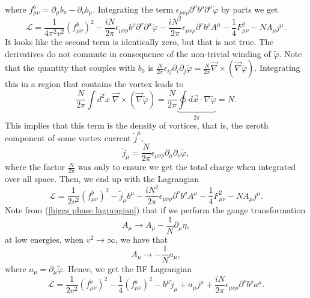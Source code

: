 \documentclass{article}
\begin{document}
where $f_{\mu\nu}^b = \partial_\mu b_\nu - \partial_\nu b_\mu$. Integrating the term $\epsilon_{\mu\nu\rho}\partial^\nu b^\rho\partial^\mu\tilde{\varphi}$ by parts we get 
\begin{equation}
	\mathcal{L} = \frac{1}{4\pi^2v^2}(f_{\mu\nu}^b)^2-\frac{iN}{2\pi}\epsilon_{\mu\nu\rho}b^\rho\partial^\nu\partial^\mu\tilde{\varphi} - \frac{iN^2}{2\pi}\epsilon_{\mu\nu\rho}\partial^\nu b^\rho A^\mu -\frac{1}{4}F_{\mu\nu}^2-NA_\mu j^{\mu}. 
\end{equation}
It looks like the second term is identically zero, but that is not true. The derivatives do not commute in consequence of the non-trivial winding of $\tilde{\varphi}$. Note that the quantity that couples with $b_0$ is $\frac{N}{2\pi}\epsilon_{ij}\partial_i\partial_j\tilde{\varphi}=\frac{N}{2\pi}\vec{\nabla}\times(\vec{\nabla}\tilde{\varphi})$. Integrating this in a region that contains the vortex leads to 
\begin{equation}
	\frac{N}{2\pi}	\int d^2x\;\vec{\nabla}\times(\vec{\nabla}\tilde{\varphi}) = \frac{N}{2\pi}\underbrace{\oint d\vec{x}\cdot \nabla\tilde{\varphi}}_{2\pi} = N. 
\end{equation}
This implies that this term is the density of vortices, that is, the zeroth component of some vortex current $\tilde{j}^\mu$, 
\begin{equation}
	\tilde{j}_\mu = \frac{N}{2\pi}\epsilon_{\mu\nu\rho}\partial_{\mu}\partial_{\nu}\tilde{\varphi},
\end{equation} 
where the factor $\frac{N}{2\pi}$ was only to ensure we get the total charge when integrated over all space. Then, we end up with the Lagrangian 
\begin{equation}
	\mathcal{L} = \frac{1}{2v^2}(f_{\mu\nu}^b)^2-\tilde{j}_\mu b^\mu -\frac{iN^2}{2\pi}\epsilon_{\mu\nu\rho}\partial^\nu b^\rho A^\mu - \frac{1}{4}F_{\mu\nu}^2-NA_\mu j^\mu. 
\end{equation}
Note from (\ref{higgs phase lagrangian}) that if we perform the gauge transformation 
\begin{equation}
	A_\mu \to A_\mu - \frac{1}{N}\partial_\mu\eta,
\end{equation}
at low energies, when $v^2\to\infty$, we have that 
\begin{equation}
	A_\mu \to -\frac{1}{N}a_\mu,
\end{equation}
where $a_\mu = \partial_\mu\tilde{\varphi}$. 
Hence, we get the BF Lagrangian 
\begin{equation}
	\mathcal{L} = \frac{1}{2v^2}(f_{\mu\nu}^b)^2- \frac{1}{4}(f_{\mu\nu}^a)^2- b^\mu\tilde{j}_\mu+a_\mu j^\mu +\frac{iN}{2\pi}\epsilon_{\mu\nu\rho}\partial^\nu b^\rho a^\mu . 
\end{equation}
\end{document}
